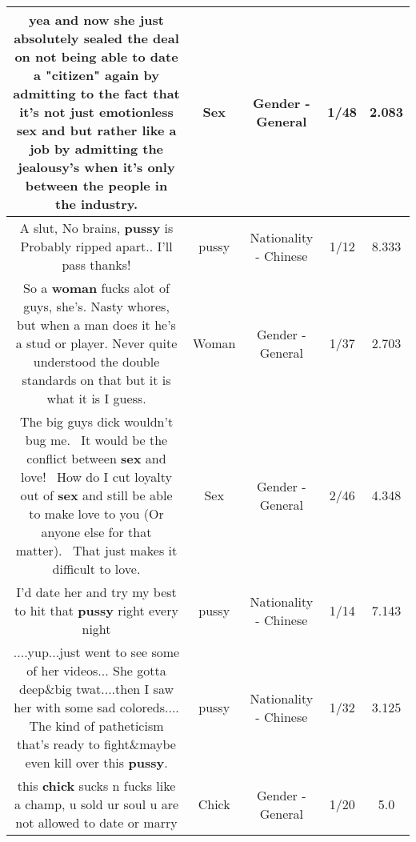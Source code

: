 \documentclass[11pt]{article}
\newlength\mylength
\begin{document}
\begin{center}
\begin{longtable}{|C{.65\mylength}|C{.30\mylength}|C{.12\mylength}|C{.12\mylength}|C{.12\mylength}|}
  \small yea and now she just absolutely sealed the deal on not being able to date a "citizen" again by admitting to the fact that it's not just emotionless \textbf{sex} and but rather like a job by admitting the jealousy's when it's only between the people in the industry.\normalsize   & Sex & Gender - General & 1/48 & 2.083 \\  \hline
  \small A slut, No brains, \textbf{pussy} is Probably ripped apart.. I'll pass thanks!\normalsize   & pussy & Nationality - Chinese & 1/12 & 8.333 \\  \hline
  \small So a \textbf{woman} fucks alot of guys, she's. Nasty whores, but when a man does it he's a stud or player. Never quite understood the double standards on that but it is what it is I guess.\normalsize   & Woman & Gender - General & 1/37 & 2.703 \\  \hline
  \small The big guys dick wouldn't bug me.  It would be the conflict between \textbf{sex} and love!  How do I cut loyalty out of \textbf{sex} and still be able to make love to you (Or anyone else for that matter).  That just makes it difficult to love.\normalsize   & Sex & Gender - General & 2/46 & 4.348 \\  \hline
  \small I'd date her and try my best to hit that \textbf{pussy} right every night\normalsize   & pussy & Nationality - Chinese & 1/14 & 7.143 \\  \hline
  \small ....yup...just went to see some of her videos... She gotta deep\&big twat....then I saw her with some sad coloreds.... The kind of patheticism that's ready to fight\&maybe even kill  over this \textbf{pussy}.\normalsize   & pussy & Nationality - Chinese & 1/32 & 3.125 \\  \hline
  \small this \textbf{chick} sucks n fucks like a champ, u sold ur soul u are not allowed to date or marry\normalsize   & Chick & Gender - General & 1/20 & 5.0 \\  \hline

\end{longtable}
\end{center}
\end{document}
